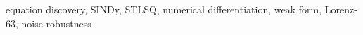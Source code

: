 equation discovery, SINDy, STLSQ, numerical differentiation, weak form, Lorenz-63, noise robustness
